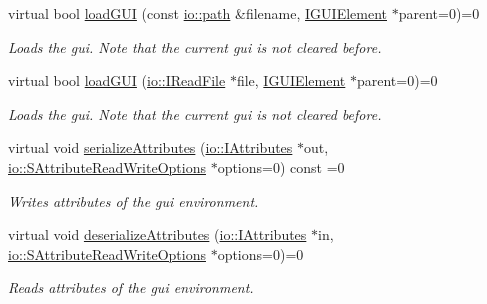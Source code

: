 \begin{DoxyCompactItemize}
virtual bool \hyperlink{classirr_1_1gui_1_1IGUIEnvironment_a6e847a40e5c97c846f2d654605ae13a0}{load\+G\+UI} (const \hyperlink{namespaceirr_1_1io_a6468281622ce3a1c46b72e19f32dded5}{io\+::path} \&filename, \hyperlink{classirr_1_1gui_1_1IGUIElement}{I\+G\+U\+I\+Element} $\ast$parent=0)=0
\begin{DoxyCompactList}\small\item\em Loads the gui. Note that the current gui is not cleared before. \end{DoxyCompactList}\item 
virtual bool \hyperlink{classirr_1_1gui_1_1IGUIEnvironment_a23e53c388d45358c53304d095f0b029b}{load\+G\+UI} (\hyperlink{classirr_1_1io_1_1IReadFile}{io\+::\+I\+Read\+File} $\ast$file, \hyperlink{classirr_1_1gui_1_1IGUIElement}{I\+G\+U\+I\+Element} $\ast$parent=0)=0
\begin{DoxyCompactList}\small\item\em Loads the gui. Note that the current gui is not cleared before. \end{DoxyCompactList}\item 
\mbox{\label{classirr_1_1gui_1_1IGUIEnvironment_a6342ec41dcd9fbd3f587dce369d11b34}} 
virtual void \hyperlink{classirr_1_1gui_1_1IGUIEnvironment_a6342ec41dcd9fbd3f587dce369d11b34}{serialize\+Attributes} (\hyperlink{classirr_1_1io_1_1IAttributes}{io\+::\+I\+Attributes} $\ast$out, \hyperlink{structirr_1_1io_1_1SAttributeReadWriteOptions}{io\+::\+S\+Attribute\+Read\+Write\+Options} $\ast$options=0) const =0
\begin{DoxyCompactList}\small\item\em Writes attributes of the gui environment. \end{DoxyCompactList}\item 
\mbox{\label{classirr_1_1gui_1_1IGUIEnvironment_a8890a0b0cb5a08c9cca65c6efa3a1e0e}} 
virtual void \hyperlink{classirr_1_1gui_1_1IGUIEnvironment_a8890a0b0cb5a08c9cca65c6efa3a1e0e}{deserialize\+Attributes} (\hyperlink{classirr_1_1io_1_1IAttributes}{io\+::\+I\+Attributes} $\ast$in, \hyperlink{structirr_1_1io_1_1SAttributeReadWriteOptions}{io\+::\+S\+Attribute\+Read\+Write\+Options} $\ast$options=0)=0
\begin{DoxyCompactList}\small\item\em Reads attributes of the gui environment. \end{DoxyCompactList}\item 

\end{DoxyCompactItemize}
